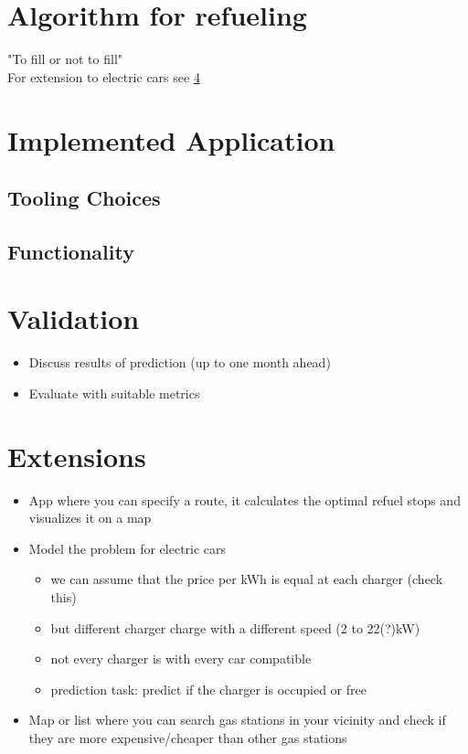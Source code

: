 \documentclass[%
a4paper,
DIV12,
2.5headlines,
bigheadings,
titlepage,
openbib,
]{scrartcl}
\begin{document}
\section{Algorithm for refueling}
"To fill or not to fill"\cite{khuller2007fill}\\
For extension to electric cars see \ref{extensions}

\section{Implemented Application}\label{implemented-application}
\subsection{Tooling Choices}\label{tooling-choices}



\subsection{Functionality}\label{functionality}



\section{Validation}\label{validation}
\begin{itemize}
\item Discuss results of prediction (up to one month ahead)
\item Evaluate with suitable metrics
\end{itemize}


\section{Extensions}\label{extensions}
\begin{itemize}
\item App where you can specify a route, it calculates the optimal refuel stops and visualizes it on a map
\item Model the problem for electric cars

\begin{itemize}
\item we can assume that the price per kWh is equal at each charger (check this)\\
\item but different charger charge with a different speed (2 to 22(?)kW)\\
\item not every charger is with every car compatible\\
\item prediction task: predict if the charger is occupied or free\\
\end{itemize}

\item Map or list where you can search gas stations in your vicinity and check if they are more expensive/cheaper than other gas stations
\end{itemize}


 
\end{document}
